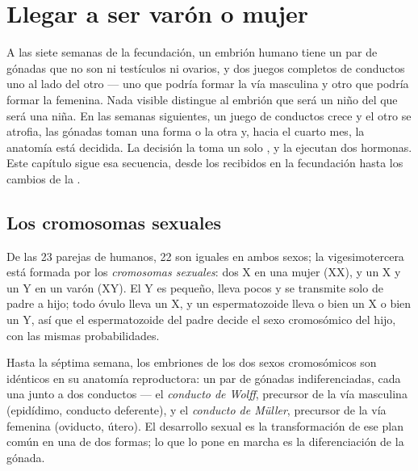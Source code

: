 \chapter{Llegar a ser varón o mujer}\label{ch:g11:becoming-male-female}

A las siete semanas de la fecundación, un embrión humano tiene un par
de gónadas que no son ni testículos ni ovarios, y dos juegos completos
de conductos uno al lado del otro --- uno que podría formar la vía
masculina y otro que podría formar la femenina. Nada visible distingue
al embrión que será un niño del que será una niña. En las semanas
siguientes, un juego de conductos crece y el otro se atrofia, las
gónadas toman una forma o la otra y, hacia el cuarto mes, la anatomía
está decidida. La decisión la toma un solo , y la ejecutan dos
hormonas. Este capítulo sigue esa secuencia, desde los 
recibidos en la fecundación hasta los cambios de la .

\section{Los cromosomas sexuales}

\begin{definition}\label{def:g11:becoming-male-female:chromosomes}
De las 23 parejas de  humanos, 22 son iguales en ambos sexos;
la vigesimotercera está formada por los \emph{cromosomas
sexuales}: dos  X en una mujer
(XX), y un X y un Y en un varón (XY). El Y es pequeño, lleva pocos
 y se transmite solo de padre a hijo; todo óvulo lleva un X, y un
espermatozoide lleva o bien un X o bien un Y, así que el espermatozoide
del padre decide el sexo cromosómico del hijo, con las mismas
probabilidades.
\end{definition}

\begin{proposition}\label{prop:g11:becoming-male-female:undifferentiated}
Hasta la séptima semana, los embriones de los dos sexos cromosómicos
son idénticos en su anatomía reproductora: un par de gónadas
indiferenciadas, cada una junto a dos conductos --- el \emph{conducto
de Wolff}, precursor de la vía masculina (epidídimo, conducto
deferente), y el \emph{conducto de Müller}, precursor de la vía
femenina (oviducto, útero). El desarrollo sexual es la transformación
de ese plan común en una de dos formas; lo que lo pone en marcha es la
diferenciación de la gónada.
\end{proposition}
\admitted

